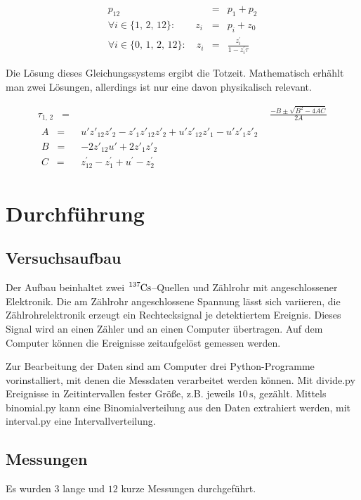 \documentclass[12pt,a4paper]{scrartcl}
\numberwithin{equation}{section} %
\newcommand{\eqspaced}{\ensuremath{\;\;=\;\;}} %
\newcommand{\code}[1]{\textsf{#1}}
\begin{document}
\begin{eqnarray}
	p_{12} &=& p_1 + p_2 \\
	\forall i\in\{1,\,2,\,12\}:\qquad
		z_i &=& p_i + z_0 \\
	\forall i\in\{0,\,1,\,2,\,12\}:\quad
		z_i &=& \frac{z^\prime_i}{1-z^\prime_i \tau}
\end{eqnarray}

\noindent
Die Lösung dieses Gleichungssystems ergibt die Totzeit. Mathematisch erhählt man zwei Lösungen, allerdings ist nur eine davon physikalisch relevant.

\begin{align}
	\tau _{1,\,2} \eqspaced& \frac{-B \pm \sqrt{B^2 - 4AC}}{2A} \label{eq:Totzeit} \\
	\begin{split}
		A \eqspaced& u'z'_{12}z'_2 - z'_1z'_12z'_2 + u'z'_{12}z'_1 - u'z'_1z'_2 \\
		B \eqspaced& -2z'_{12}u' + 2z'_1z'_2 \\
		C \eqspaced& z^\prime _{12} - z^\prime _1 + u^\prime  - z^\prime _2
	\end{split}
\end{align}

\clearpage
\hypertarget{durchfuxfchrung}{%
\section{Durchführung}\label{durchfuxfchrung}}
\subsection{Versuchsaufbau}
Der Aufbau beinhaltet zwei $\ce{^{137}Cs}$--Quellen und Zählrohr mit angeschlossener Elektronik. Die am Zählrohr angeschlossene Spannung lässt sich variieren, die Zählrohrelektronik erzeugt ein Rechtecksignal je detektiertem Ereignis. Dieses Signal wird an einen Zähler und an einen Computer übertragen. Auf dem Computer können die Ereignisse zeitaufgelöst gemessen werden.

Zur Bearbeitung der Daten sind am Computer drei Python-Programme vorinstalliert, mit denen die Messdaten verarbeitet werden können. Mit \code{divide.py} Ereignisse in Zeitintervallen fester Größe, z.B.  jeweils $10\mathrm{\,s}$, gezählt. Mittels \code{binomial.py} kann eine Binomialverteilung aus den Daten extrahiert werden, mit \code{interval.py} eine Intervallverteilung.

\subsection{Messungen}
Es wurden $3$ lange und $12$ kurze Messungen durchgeführt.
\end{document}
